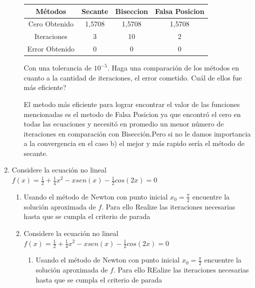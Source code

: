 \documentclass{udparticle}
\begin{document}
\begin{enumerate}
\begin{enumerate}
        \begin{table}[H]
        \centering
            \begin{tabular} { |c|c|c|c|}
            
            \hline
            Métodos       & Secante & Biseccion & Falsa Posicion \\
            \hline
            Cero Obtenido &  1,5708       &   1,5708       &      1,5708        \\
            \hline
            Iteraciones   &     3        &      10        &        2       \\
            \hline
            Error Obtenido  &   0        &      0      &          0  \\
            \hline
            
            \end{tabular}
        \end{table}
        
    Con una tolerancia de $ 10^{-5} $. Haga una comparación de los métodos en cuanto a la cantidad de iteraciones, el error cometido. Cuál de ellos fue más eficiente?
    
    El metodo más eficiente para lograr encontrar el valor de las funciones mencionadas es el metodo de Falsa Posicion ya que encontró el cero en todas las ecuaciones y necesitó en promedio un menor número de iteraciones en comparación con Bisección.Pero si no le damos importancia a la convergencia en el caso b) el mejor y más rapido sería el método de secante.
    
    \end{enumerate}
\newpage
\item Considere la ecuación no lineal $f(x)= \frac{1}{2}+\frac{1}{4}x^2-xsen(x)-\frac{1}{2}cos(2x)=0$
    	\begin{enumerate}
    	\item  Usando el método de Newton con punto inicial $x_{0}=\frac{\pi}{2}$ encuentre la solución aproximada de $f$. Para ello Realize las iteraciones necesarias hasta que se cumpla el criterio de parada %
    
    \item Considere la ecuación no lineal $f(x)= \frac{1}{2}+\frac{1}{4}x^2-xsen(x)-\frac{1}{2}cos(2x)=0$
        	\begin{enumerate}
        	\item  Usando el método de Newton con punto inicial $x_{0}=\frac{\pi}{2}$ encuentre la solución aproximada de $f$. Para ello REalize las iteraciones necesarias hasta que se cumpla el criterio de parada %
        

\end{enumerate}
\end{enumerate}
\end{enumerate}
\end{document}
